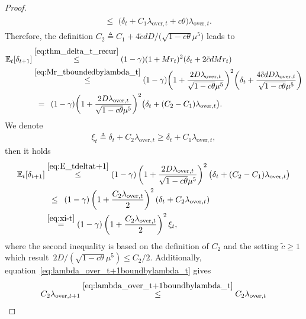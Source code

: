 \documentclass[11pt]{article}
\theoremstyle{plain}
\theoremstyle{definition}
\theoremstyle{remark}
\theoremstyle{plain}
\begin{document}
\begin{proof}
\begin{align}
\begin{split}
&~\leq\,\,\bigl(\delta_t
+C_1\lambda_{\mathrm{over},t}+c\theta\bigr)\lambda_{\mathrm{over},t}.
\end{split}
\end{align}
Therefore, the definition $C_2\triangleq C_1+4\tilde{c}dD/\big(\sqrt{1-c\theta}\mu^5\big)$ leads to
\begin{align}\label{eq:E_tdeltat+1}
\begin{split}    
\mathbb E_t[\delta_{t+1}]
&\overset{\eqref{eq:thm_delta_t_recur}}{\leq}
(1-\gamma)(1+Mr_t)^2(\delta_t+2\tilde c dMr_t)\\
&\overset{\eqref{eq:Mr_tboundedbylambda_t}}{\leq}
(1-\gamma)\biggl(1+\frac{2D\lambda_{\mathrm{over},t}}{\sqrt{1-c\theta}\mu^5}
\biggr)^2
\biggl(\delta_t+\frac{4\tilde c dD\lambda_{\mathrm{over},t}}{\sqrt{1-c\theta}\mu^5}
\biggr)\\
&~\,=~\,(1-\gamma)\biggl(1+\frac{2D\lambda_{\mathrm{over},t}}{\sqrt{1-c\theta}\mu^5}
\biggr)^2
\bigl(\delta_t+(C_2-C_1)\lambda_{\mathrm{over},t}\bigr).
\end{split}
\end{align}
We denote
\begin{align}\label{eq:xi-t}
    \xi_t\triangleq\delta_t+C_2\lambda_{\mathrm{over},t} \geq \delta_t+C_1\lambda_{\mathrm{over},t},
\end{align}
then it holds
\begin{align}\label{eq:overfit_delta_recur}
\begin{split}    
\mathbb E_t[\delta_{t+1}]
&\overset{\eqref{eq:E_tdeltat+1}}{\leq}(1-\gamma)\left(1+\frac{2D\lambda_{\mathrm{over},t}}{\sqrt{1-c\theta}\mu^5}
\right)^2\bigl(\delta_t+(C_2-C_1)\lambda_{\mathrm{over},t}\bigr)\\
&~\,\leq\,~(1-\gamma)
\left(1+\frac{C_2\lambda_{\mathrm{over},t}}{2}\right)^2
\left(\delta_t+C_2\lambda_{\mathrm{over},t}\right)\\
&\overset{\eqref{eq:xi-t}}{=}(1-\gamma)
\left(1+\frac{C_2\lambda_{\mathrm{over},t}}{2}\right)^2\xi_t,  
\end{split}
\end{align}
where the second inequality is based on the definition of $C_2$ and the setting $\tilde c \geq 1$ which result~$2D/(\sqrt{1-c\theta}\mu^5)\leq C_2/2$. 
Additionally, equation~\eqref{eq:lambda_over_t+1boundbylambda_t} gives
\begin{align}
\label{eq:overfit_lambda_recur}
\begin{split}
C_2\lambda_{\mathrm{over},t+1}
 \overset{\eqref{eq:lambda_over_t+1boundbylambda_t}}{\leq} C_2\lambda_{\mathrm{over},t}

\end{split}
\end{align}
\end{proof}
\end{document}
